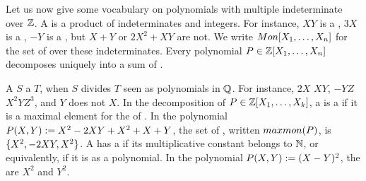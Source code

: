 \AP Let us now give some vocabulary on polynomials with multiple indeterminate
over $\mathbb{Z}$. A  is a product of indeterminates and integers.
For instance, $XY$ is a , $3 X$ is a , $-Y$ is a
, but $X + Y$ or $2X^2 + XY$ are not. We write $\Monomials[X_1,
\dots, X_n]$ for the set of  over these indeterminates.
Every polynomial $P \in \mathbb{Z}[X_1, \dots, X_n]$ decomposes uniquely
into a sum of .

\AP A  $S$  a  $T$, when $S$ divides
$T$ seen as polynomials in $\mathbb{Q}$. For instance, $2X$  $XY$, $-YZ$
 $X^2 Y Z^3$, and $Y$ does not  $X$. In the
decomposition of $P \in \mathbb{Z}[X_1, \dots, X_k]$, a  is a
 if it is a maximal element for the  of . In the polynomial $P(X,Y) \mathrel{:=} X^2 - 2XY + X^2
+ X + Y$, the set of , written
$\MaximalMonomials(P)$, is $\mathopen{\{} X^2,  -2 XY,  X^2 \mathclose{\}}$. A  has a
 if its multiplicative constant belongs to
$\mathbb{N}$, or equivalently, if it is  as a polynomial. In the
polynomial $P(X,Y) \mathrel{:=} (X - Y)^2$, the  
are $X^2$ and $Y^2$.
